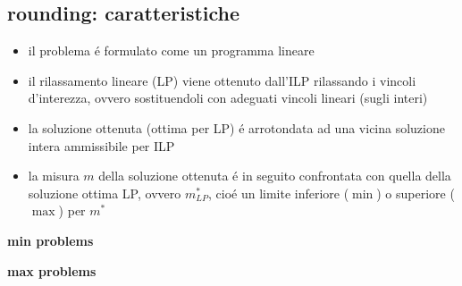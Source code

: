 \subsection*{rounding: caratteristiche}
\begin{flushleft}
	\begin{itemize}
		\item il problema \'e formulato come un programma lineare
		\item il rilassamento lineare (LP) viene ottenuto dall'ILP rilassando i vincoli d'interezza, ovvero sostituendoli con adeguati vincoli lineari (sugli interi)
		\item la soluzione ottenuta (ottima per LP) \'e arrotondata ad una vicina soluzione intera ammissibile per ILP
		\item la misura $m$ della soluzione ottenuta \'e in seguito confrontata con quella della soluzione ottima LP, ovvero $m_{LP}^*$, cio\'e un limite inferiore ($\min$) o superiore ($\max$) per $m^*$
	\end{itemize}
	\vspace{0.5cm}
	\begin{center}
		\textbf{min problems}\newline \\
		\vspace{0.3cm}
	\end{center}
	\begin{center}
		\textbf{max problems}\newline \\
		\vspace{0.3cm}
	\end{center}
\end{flushleft}

